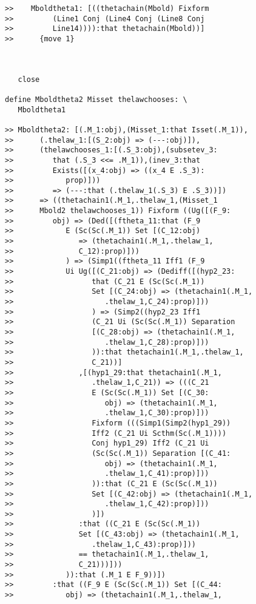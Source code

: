 \documentclass[12pt]{article}
\begin{document}
\begin{verbatim}
>>    Mboldtheta1: [((thetachain(Mbold) Fixform
>>         (Line1 Conj (Line4 Conj (Line8 Conj
>>         Line14)))):that thetachain(Mbold))]
>>      {move 1}



   close

define Mboldtheta2 Misset thelawchooses: \
   Mboldtheta1

>> Mboldtheta2: [(.M_1:obj),(Misset_1:that Isset(.M_1)),
>>      (.thelaw_1:[(S_2:obj) => (---:obj)]),
>>      (thelawchooses_1:[(.S_3:obj),(subsetev_3:
>>         that (.S_3 <<= .M_1)),(inev_3:that
>>         Exists([(x_4:obj) => ((x_4 E .S_3):
>>            prop)]))
>>         => (---:that (.thelaw_1(.S_3) E .S_3))])
>>      => ((thetachain1(.M_1,.thelaw_1,(Misset_1
>>      Mbold2 thelawchooses_1)) Fixform ((Ug([(F_9:
>>         obj) => (Ded([(ftheta_11:that (F_9
>>            E (Sc(Sc(.M_1)) Set [(C_12:obj)
>>               => (thetachain1(.M_1,.thelaw_1,
>>               C_12):prop)]))
>>            ) => (Simp1((ftheta_11 Iff1 (F_9
>>            Ui Ug([(C_21:obj) => (Dediff([(hyp2_23:
>>                  that (C_21 E (Sc(Sc(.M_1))
>>                  Set [(C_24:obj) => (thetachain1(.M_1,
>>                     .thelaw_1,C_24):prop)]))
>>                  ) => (Simp2((hyp2_23 Iff1
>>                  (C_21 Ui (Sc(Sc(.M_1)) Separation
>>                  [(C_28:obj) => (thetachain1(.M_1,
>>                     .thelaw_1,C_28):prop)]))
>>                  )):that thetachain1(.M_1,.thelaw_1,
>>                  C_21))]
>>               ,[(hyp1_29:that thetachain1(.M_1,
>>                  .thelaw_1,C_21)) => (((C_21
>>                  E (Sc(Sc(.M_1)) Set [(C_30:
>>                     obj) => (thetachain1(.M_1,
>>                     .thelaw_1,C_30):prop)]))
>>                  Fixform (((Simp1(Simp2(hyp1_29))
>>                  Iff2 (C_21 Ui Scthm(Sc(.M_1))))
>>                  Conj hyp1_29) Iff2 (C_21 Ui
>>                  (Sc(Sc(.M_1)) Separation [(C_41:
>>                     obj) => (thetachain1(.M_1,
>>                     .thelaw_1,C_41):prop)]))
>>                  )):that (C_21 E (Sc(Sc(.M_1))
>>                  Set [(C_42:obj) => (thetachain1(.M_1,
>>                     .thelaw_1,C_42):prop)]))
>>                  )])
>>               :that ((C_21 E (Sc(Sc(.M_1))
>>               Set [(C_43:obj) => (thetachain1(.M_1,
>>                  .thelaw_1,C_43):prop)]))
>>               == thetachain1(.M_1,.thelaw_1,
>>               C_21)))]))
>>            )):that (.M_1 E F_9))])
>>         :that ((F_9 E (Sc(Sc(.M_1)) Set [(C_44:
>>            obj) => (thetachain1(.M_1,.thelaw_1,

\end{verbatim}
\end{document}
